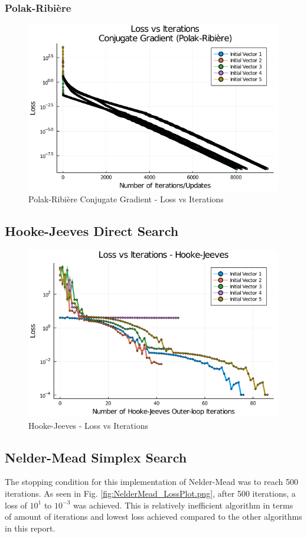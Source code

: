 \documentclass{article}
\begin{document}
    \subsubsection{Polak-Ribi\`ere}
    \begin{figure}[H]
        \centering
        \includegraphics[width=0.5\linewidth]{./ConjugateGradientPolakRibiere_LossPlot.png}
        \caption{Polak-Ribi\`ere Conjugate Gradient - Loss vs Iterations}
        \label{fig:ConjugateGradientPolakRibiere_LossPlot.png}
    \end{figure}

    \subsection{Hooke-Jeeves Direct Search}

    \begin{figure}[H]
        \centering
        \includegraphics[width=0.5\linewidth]{./HookeJeevesLossPlot.png}
        \caption{Hooke-Jeeves - Loss vs Iterations}
        \label{fig:HookeJeevesLossPlot.png}
    \end{figure}

    \subsection{Nelder-Mead Simplex Search}

    The stopping condition for this implementation of Nelder-Mead was to reach 500 iterations. As seen in Fig. \ref{fig:NelderMead_LossPlot.png}, after 500 iterations, a loss of $10^1$ to $10^{-3}$ was achieved. This is relatively inefficient algorithm in terms of amount of iterations and lowest loss achieved compared to the other algorithms in this report.
\end{document}
